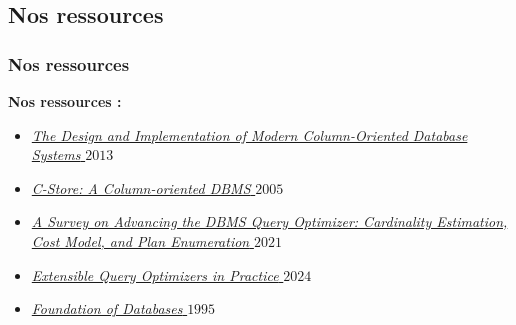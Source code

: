\documentclass[aspectratio=43,12pt]{beamer}
\begin{document}
\subsection{Nos ressources}
\begin{frame}
    \frametitle{Nos ressources}
    \textbf{Nos ressources :}
    \begin{itemize}
        \item \href{https://drive.google.com/file/d/1KNmuRBf8CV-s-zqdkUEP8iyYlPgFiglb/view?usp=drive_link}{\textit{The Design and Implementation of Modern Column-Oriented Database Systems} \(2013\)}
        \item \href{https://web.stanford.edu/class/cs345d-01/rl/cstore.pdf}{\textit{C-Store: A Column-oriented DBMS} \(2005\)}
        \item \href{https://link.springer.com/content/pdf/10.1007/s41019-020-00149-7.pdf}{\textit{A Survey on Advancing the DBMS Query Optimizer: Cardinality Estimation, Cost Model, and Plan Enumeration} \(2021\)}
        \item \href{https://www.microsoft.com/en-us/research/wp-content/uploads/2024/12/Extensible-Query-Optimizers-in-Practice.pdf}{\textit{Extensible Query Optimizers in Practice} \(2024\)}
        \item \href{http://webdam.inria.fr/Alice/}{\textit{Foundation of Databases} \(1995\)}
    \end{itemize}
\end{frame}
\end{document}
